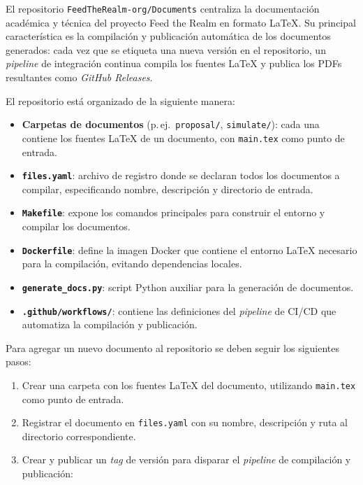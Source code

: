 El repositorio \texttt{FeedTheRealm-org/Documents} centraliza la documentación académica y técnica del proyecto Feed the Realm
en formato \LaTeX. Su principal característica es la compilación y publicación automática de los documentos generados: 
cada vez que se etiqueta una nueva versión en el repositorio, un \textit{pipeline} de integración continua compila los 
fuentes \LaTeX{} y publica los PDFs resultantes como \textit{GitHub Releases}.
\vspace{0.25cm}

El repositorio está organizado de la siguiente manera:
\vspace{0.25cm}

\begin{itemize}
    \item \textbf{Carpetas de documentos} (p.\,ej.\ \texttt{proposal/}, \texttt{simulate/}): cada una contiene los fuentes 
    \LaTeX{} de un documento, con \texttt{main.tex} como punto de entrada.
    \item \textbf{\texttt{files.yaml}}: archivo de registro donde se declaran todos los documentos a compilar, especificando 
    nombre, descripción y directorio de entrada.
    \item \textbf{\texttt{Makefile}}: expone los comandos principales para construir el entorno y compilar los documentos.
    \item \textbf{\texttt{Dockerfile}}: define la imagen Docker que contiene el entorno \LaTeX{} necesario para la compilación, 
    evitando dependencias locales.
    \item \textbf{\texttt{generate\_docs.py}}: script Python auxiliar para la generación de documentos.
    \item \textbf{\texttt{.github/workflows/}}: contiene las definiciones del \textit{pipeline} de CI/CD que automatiza 
    la compilación y publicación.
\end{itemize}

Para agregar un nuevo documento al repositorio se deben seguir los siguientes pasos:
\vspace{0.25cm}

\begin{enumerate}
    \item Crear una carpeta con los fuentes \LaTeX{} del documento, utilizando \texttt{main.tex} como punto de entrada.
    \item Registrar el documento en \texttt{files.yaml} con su nombre, descripción y ruta al directorio correspondiente.
    \item Crear y publicar un \textit{tag} de versión para disparar el \textit{pipeline} de compilación y publicación:
\end{enumerate}

